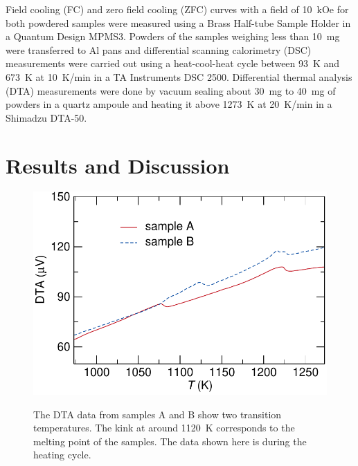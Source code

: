 \documentclass[10pt,doublespacing,edeposit]{uiucthesis2020}
\begin{document}
\begin{mainmatter}
Field cooling (FC) and zero field cooling (ZFC) curves with a field of 10~kOe for both powdered samples were measured using a Brass Half-tube Sample Holder in a Quantum Design MPMS3. Powders of the samples weighing less than 10~mg were transferred to Al pans and differential scanning calorimetry (DSC) measurements were carried out using a heat-cool-heat cycle between 93~K and 673~K at 10~K/min in a TA Instruments DSC 2500. Differential thermal analysis (DTA) measurements were done by vacuum sealing about 30~mg to 40~mg of powders in a quartz ampoule and heating it above 1273~K at 20~K/min in a Shimadzu DTA-50.


\section{Results and Discussion}


\begin{figure}
\centering\includegraphics[width=0.7\columnwidth]{figures/ch7/DTA_plots_cropped.pdf} \\
\caption{\label{fig:DTA}
The DTA data from samples A and B show two transition temperatures. The kink at around 1120~K corresponds to the melting point of the samples. The data shown here is during the heating cycle. %
} 
\end{figure}


\end{mainmatter}
\end{document}
